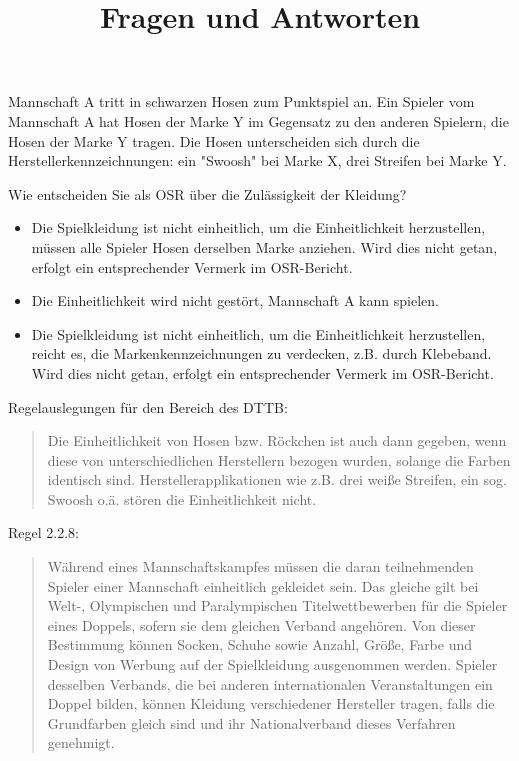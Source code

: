 \documentclass[english, ngerman]{scrartcl}
\title{Fragen und Antworten}
\begin{document}
	\maketitle


	Mannschaft A tritt in schwarzen Hosen zum Punktspiel an.
	Ein Spieler vom Mannschaft A hat Hosen der Marke Y im Gegensatz zu den anderen Spielern, die Hosen der Marke Y tragen.
	Die Hosen unterscheiden sich durch die Herstellerkennzeichnungen: ein "Swoosh" bei Marke X, drei Streifen bei Marke Y.

	Wie entscheiden Sie als OSR über die Zulässigkeit der Kleidung?

	\begin{itemize}
		\item Die Spielkleidung ist nicht einheitlich, um die Einheitlichkeit herzustellen, müssen alle Spieler Hosen derselben Marke anziehen.
			Wird dies nicht getan, erfolgt ein entsprechender Vermerk im OSR-Bericht.
		\item[\Checkedbox] Die Einheitlichkeit wird nicht gestört, Mannschaft A kann spielen.
		\item Die Spielkleidung ist nicht einheitlich, um die Einheitlichkeit herzustellen, reicht es, die Markenkennzeichnungen zu verdecken, z.B. durch Klebeband.
			Wird dies nicht getan, erfolgt ein entsprechender Vermerk im OSR-Bericht.
	\end{itemize}

	Regelauslegungen für den Bereich des DTTB:

	\begin{quote}
		Die Einheitlichkeit von Hosen bzw. Röckchen ist auch dann gegeben, wenn diese von unterschiedlichen Herstellern bezogen wurden, solange die Farben identisch sind.
		Herstellerapplikationen wie z.B. drei weiße Streifen, ein sog. Swoosh o.ä. stören die Einheitlichkeit nicht.
	\end{quote}

	Regel 2.2.8:

	\begin{quote}
		Während eines Mannschaftskampfes müssen die daran teilnehmenden Spieler einer Mannschaft einheitlich gekleidet sein.
		Das gleiche gilt bei Welt-, Olympischen und Paralympischen Titelwettbewerben für die Spieler eines Doppels, sofern sie dem gleichen Verband angehören.
		Von dieser Bestimmung können Socken, Schuhe sowie Anzahl, Größe, Farbe und Design von Werbung auf der Spielkleidung ausgenommen werden.
		Spieler desselben Verbands, die bei anderen internationalen Veranstaltungen ein Doppel bilden, können Kleidung verschiedener Hersteller tragen, falls die Grundfarben gleich sind und ihr Nationalverband dieses Verfahren genehmigt.
	\end{quote}
\end{document}
